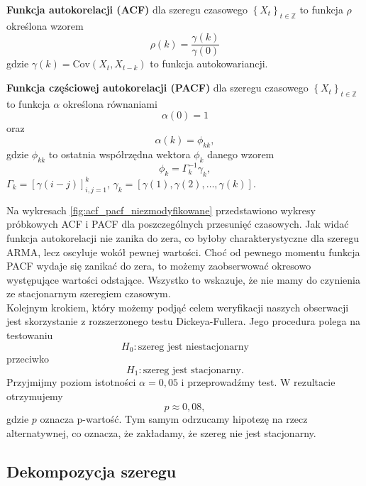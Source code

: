 \documentclass[11pt]{article}
\begin{document}
\begin{definition}
\textbf{Funkcja autokorelacji (ACF)} dla szeregu czasowego ${\left\lbrace X_t \right\rbrace}_{t \in \mathbb{Z}}$ to funkcja $\rho$ określona wzorem 
$$ \rho(k) = \frac{\gamma\left(k\right)}{\gamma\left(0\right)} $$
gdzie $\gamma(k) = \text{Cov}(X_t, X_{t-k})$ to funkcja autokowariancji.
\end{definition}

\begin{definition}
\textbf{Funkcja częściowej autokorelacji (PACF)} dla szeregu czasowego ${\left\lbrace X_t \right\rbrace}_{t \in \mathbb{Z}}$ to funkcja $\alpha$ określona równaniami 
$$ \alpha\left(0\right) = 1$$ 
oraz 
$$ \alpha\left(k\right) = \phi_{kk}, $$
gdzie $\phi_{kk}$ to ostatnia współrzędna wektora $\phi_k$ danego wzorem 
$$ \phi_k = \Gamma_k^{-1}\gamma_k, $$
$ \Gamma_k = \left[\gamma\left(i - j\right)\right]_{i,j = 1}^k $, $\gamma_k = \left[\gamma\left(1\right), \gamma\left(2\right), \ldots, \gamma\left(k\right)\right]$.
\end{definition}

Na wykresach \ref{fig:acf_pacf_niezmodyfikowane} przedstawiono wykresy próbkowych ACF i PACF dla poszczególnych przesunięć czasowych. Jak widać funkcja autokorelacji nie zanika do zera, co byłoby charakterystyczne dla szeregu ARMA, lecz oscyluje wokół pewnej wartości. Choć od pewnego momentu funkcja PACF wydaje się zanikać do zera, to możemy zaobserwować okresowo występujące wartości odstające. Wszystko to wskazuje, że nie mamy do czynienia ze stacjonarnym szeregiem czasowym. \\ 

Kolejnym krokiem, który możemy podjąć celem weryfikacji naszych obserwacji jest skorzystanie z rozszerzonego testu Dickeya-Fullera. Jego procedura polega na testowaniu 
$$ H_0: \text{szereg jest niestacjonarny} $$
przeciwko 
$$ H_1: \text{szereg jest stacjonarny}. $$
Przyjmijmy poziom istotności $\alpha = 0,05$ i przeprowadźmy test. W rezultacie otrzymujemy 
$$ p \approx 0,08, $$
gdzie $p$ oznacza p-wartość. Tym samym odrzucamy hipotezę na rzecz alternatywnej, co oznacza, że zakładamy, że szereg nie jest stacjonarny. \\ 

\subsection{Dekompozycja szeregu}
\end{document}
